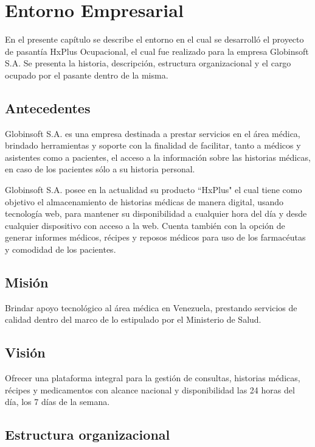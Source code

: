 \chapter{Entorno Empresarial}

En el presente capítulo se describe el entorno en el cual se desarrolló el proyecto de pasantía HxPlus Ocupacional, el cual fue realizado para la empresa Globinsoft S.A. Se presenta la historia, descripción, estructura organizacional y el cargo ocupado por el pasante dentro de la misma.

    \section{Antecedentes}
    
    Globinsoft S.A. es una empresa destinada a prestar servicios en el área médica, brindado herramientas y soporte con la finalidad de facilitar, tanto a médicos y asistentes como a pacientes, el acceso a la información sobre las historias médicas, en caso de los pacientes sólo a su historia personal.
    
    Globinsoft S.A. posee en la actualidad su producto ``HxPlus" el cual tiene como objetivo el almacenamiento de historias médicas de manera digital, usando tecnología web, para mantener su disponibilidad a cualquier hora del día y desde cualquier dispositivo con acceso a la web. Cuenta también con la opción de generar informes médicos, récipes y reposos médicos para uso de los farmacéutas y comodidad de los pacientes.
    
    
    \section{Misión}
    
    Brindar apoyo tecnológico al área médica en Venezuela, prestando servicios de calidad dentro del marco de lo estipulado por el Ministerio de Salud.
    
    \section{Visión}
    
    Ofrecer una plataforma integral para la gestión de consultas, historias médicas, récipes y medicamentos con alcance nacional y disponibilidad las 24 horas del día, los 7 días de la semana.
    
    \section{Estructura organizacional}
    
